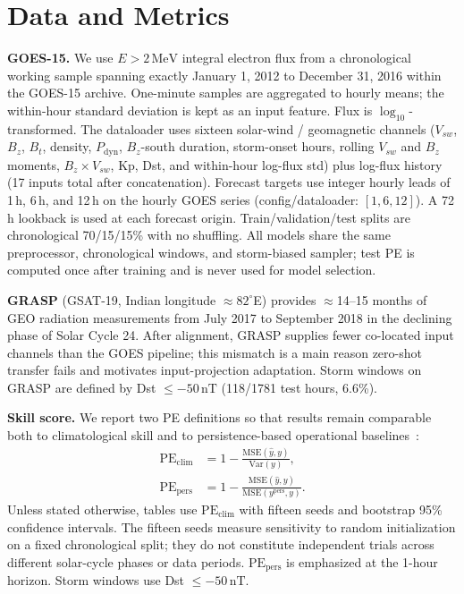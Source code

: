 \documentclass[conference]{IEEEtran}
\begin{document}
\section{Data and Metrics}
\textbf{GOES-15.} We use \(E>2\,\mathrm{MeV}\) integral electron flux from a
chronological working sample spanning exactly January 1, 2012 to December 31, 2016
within the GOES-15 archive. One-minute samples are aggregated to hourly means;
the within-hour standard deviation is kept as an input feature. Flux is
\(\log_{10}\)-transformed. The dataloader uses sixteen solar-wind /
geomagnetic channels
(\(V_{sw}\), \(B_z\), \(B_t\), density, \(P_{\mathrm{dyn}}\),
\(B_z\)-south duration, storm-onset hours, rolling \(V_{sw}\) and \(B_z\)
moments, \(B_z\times V_{sw}\), Kp, Dst, and within-hour log-flux std)
plus log-flux history (17 inputs total after concatenation). Forecast targets use integer hourly leads of 1\,h, 6\,h, and 12\,h on the hourly GOES series (config/dataloader: $[1,6,12]$). A 72\,h lookback is used at
each forecast origin. Train/validation/test splits are chronological
70/15/15\% with no shuffling. All models share the same preprocessor, chronological windows, and storm-biased sampler; test PE is computed once after training and is never used for model selection.

\textbf{GRASP} (GSAT-19, Indian longitude \(\approx82^\circ\)E) provides
$\approx$14--15 months of GEO radiation measurements from July 2017 to September 2018 in
the declining phase of Solar Cycle 24. After alignment, GRASP supplies fewer
co-located input channels than the GOES pipeline; this mismatch is a main
reason zero-shot transfer fails and motivates input-projection adaptation.
Storm windows on GRASP are defined by Dst \(\le -50\,\mathrm{nT}\)
(118/1781 test hours, 6.6\%).

\textbf{Skill score.} We report two PE definitions so that results remain comparable both to climatological skill and to persistence-based operational baselines~\cite{b12}:
\begin{align}
\mathrm{PE}_{\mathrm{clim}} &= 1 - \frac{\mathrm{MSE}(\hat y,y)}{\mathrm{Var}(y)}, \\
\mathrm{PE}_{\mathrm{pers}} &= 1 - \frac{\mathrm{MSE}(\hat y,y)}{\mathrm{MSE}(y^{\mathrm{pers}},y)}.
\end{align}
Unless stated otherwise, tables use \(\mathrm{PE}_{\mathrm{clim}}\) with fifteen seeds and bootstrap 95\% confidence intervals. The fifteen seeds measure sensitivity to random initialization on a fixed chronological split; they do not constitute independent trials across different solar-cycle phases or data periods. \(\mathrm{PE}_{\mathrm{pers}}\) is emphasized at the 1-hour horizon. Storm windows use Dst \(\le -50\,\mathrm{nT}\).
\end{document}
